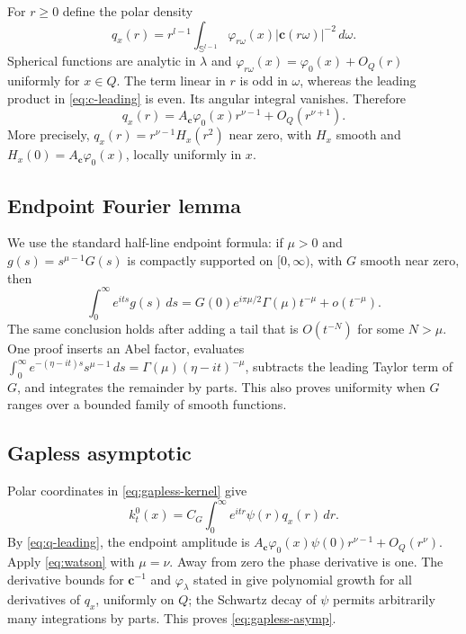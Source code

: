 \documentclass[11pt]{article}
\newcommand{\Sphere}{\mathbb S}
\newcommand{\cHC}{\mathbf c}
\newcommand{\dd}{\,d}
\begin{document}
For $r\ge0$ define the polar density
\[
 q_x(r)=r^{l-1}\int_{\Sphere^{l-1}}
 \varphi_{r\omega}(x)|\cHC(r\omega)|^{-2}\dd\omega.
\]
Spherical functions are analytic in $\lambda$ and
$\varphi_{r\omega}(x)=\varphi_0(x)+O_Q(r)$ uniformly for $x\in Q$.
The term linear in $r$ is odd in $\omega$, whereas the leading product in
\eqref{eq:c-leading} is even.  Its angular integral vanishes.  Therefore
\begin{equation}\label{eq:q-leading}
 q_x(r)=A_{\cHC}\varphi_0(x)r^{\nu-1}+O_Q(r^{\nu+1}).
\end{equation}
More precisely, $q_x(r)=r^{\nu-1}H_x(r^2)$ near zero, with $H_x$ smooth
and $H_x(0)=A_{\cHC}\varphi_0(x)$, locally uniformly in $x$.

\subsection{Endpoint Fourier lemma}

We use the standard half-line endpoint formula: if $\mu>0$ and
$g(s)=s^{\mu-1}G(s)$ is compactly supported on $[0,\infty)$, with $G$
smooth near zero, then
\begin{equation}\label{eq:watson}
 \int_0^\infty e^{its}g(s)\dd s
 =G(0)e^{i\pi\mu/2}\Gamma(\mu)t^{-\mu}+o(t^{-\mu}).
\end{equation}
The same conclusion holds after adding a tail that is $O(t^{-N})$ for some
$N>\mu$.  One proof inserts an Abel factor, evaluates
$\int_0^\infty e^{-(\eta-it)s}s^{\mu-1}\dd s
=\Gamma(\mu)(\eta-it)^{-\mu}$, subtracts the leading Taylor term of $G$,
and integrates the remainder by parts.  This also proves uniformity when
$G$ ranges over a bounded family of smooth functions.

\subsection{Gapless asymptotic}

Polar coordinates in \eqref{eq:gapless-kernel} give
\[
 k_t^0(x)=C_G\int_0^\infty e^{itr}\psi(r)q_x(r)\dd r.
\]
By \eqref{eq:q-leading}, the endpoint amplitude is
$A_{\cHC}\varphi_0(x)\psi(0)r^{\nu-1}+O_Q(r^\nu)$.
Apply \eqref{eq:watson} with $\mu=\nu$.  Away from zero the phase derivative
is one.  The derivative bounds for $\cHC^{-1}$ and $\varphi_\lambda$ stated
in \cite[Sec.~2.2]{KS} give polynomial growth for all derivatives of $q_x$,
uniformly on $Q$; the Schwartz decay of $\psi$ permits arbitrarily many
integrations by parts.  This proves \eqref{eq:gapless-asymp}.
\end{document}
